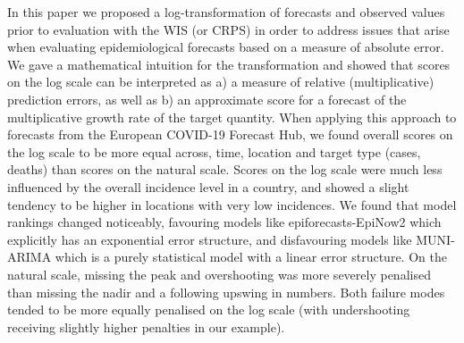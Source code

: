 \documentclass{article}
\begin{document}
In this paper we proposed a log-transformation of forecasts and observed values prior to evaluation with the WIS (or CRPS) in order to address issues that arise when evaluating epidemiological forecasts based on a measure of absolute error. We gave a mathematical intuition for the transformation and showed that scores on the log scale can be interpreted as a) a measure of relative (multiplicative) prediction errors, as well as b) an approximate score for a forecast of the multiplicative growth rate of the target quantity. 
When applying this approach to forecasts from the European COVID-19 Forecast Hub, we found overall scores on the log scale to be more equal across, time, location and target type (cases, deaths) than scores on the natural scale. Scores on the log scale were much less influenced by the overall incidence level in a country, and showed a slight tendency to be higher in locations with very low incidences. We found that model rankings changed noticeably, favouring models like epiforecasts-EpiNow2 which explicitly has an exponential error structure, and disfavouring models like MUNI-ARIMA which is a purely statistical model with a linear error structure. On the natural scale, missing the peak and overshooting was more severely penalised than missing the nadir and a following upswing in numbers. Both failure modes tended to be more equally penalised on the log scale (with undershooting receiving slightly higher penalties in our example). 
\end{document}

